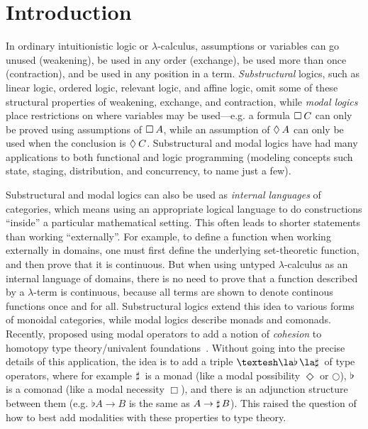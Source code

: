 
\section{Introduction}

In ordinary intuitionistic logic or $\lambda$-calculus, assumptions or
variables can go unused (weakening), be used in any order (exchange), be
used more than once (contraction), and be used in any position in a
term.  \emph{Substructural} logics, such as linear logic, ordered logic,
relevant logic, and affine logic, omit some of these structural
properties of weakening, exchange, and contraction, while \emph{modal
  logics} place restrictions on where variables may be used---e.g. a
formula $\Box_{} \, {C}$ can only be proved using assumptions of $\Box_{} \, {A}$,
while an assumption of $\Diamond_{} \, {A}$ can only be used when the conclusion
is $\Diamond_{} \, {C}$.  Substructural and modal logics have had many
applications to both functional and logic programming (modeling concepts
such state, staging, distribution, and concurrency, to name just a few).

Substructural and modal logics can also be used as \emph{internal
  languages} of categories, which means using an appropriate logical
language to do constructions ``inside'' a particular mathematical
setting.  This often leads to shorter statements than working
``externally''.  For example, to define a function when working
externally in domains, one must first define the underlying
set-theoretic function, and then prove that it is continuous.  But when
using untyped $\lambda$-calculus as an internal language of domains,
there is no need to prove that a function described by a $\lambda$-term
is continuous, because all terms are shown to denote continous functions
once and for all.  Substructural logics extend this idea to various
forms of monoidal categories, while modal logics describe monads and
comonads.  Recently,
\citet{schreibershulman12cohesive,shulman15realcohesion} proposed using
modal operators to add a notion of \emph{cohesion} to homotopy type
theory/univalent foundations~\citep{voevodsky06homotopy,uf13hott-book}.
Without going into the precise details of this application, the idea is
to add a triple $\sh{} \la \Flat{} \la \Sharp{}$ of type operators,
where for example $\sharp \, {}$ is a monad (like a modal possibility
$\Diamond$ or $\bigcirc$), $\flat \, {}$ is a comonad (like a modal
necessity $\Box$), and there is an adjunction structure between them
(e.g. $\flat{A} \to B$ is the same as $A \to \sharp \, {B}$).  This raised
the question of how to best add modalities with these properties to type
theory.

